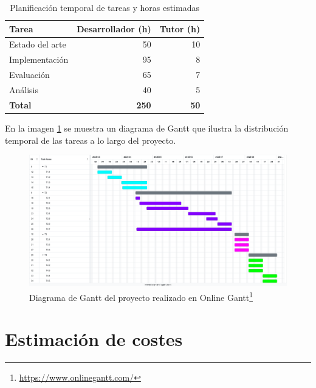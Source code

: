 \begin{table}[!ht]
      \centering
      \setlength{\tabcolsep}{3pt}
      \renewcommand{\arraystretch}{1.1}
      \begin{tabular}{|p{3cm}|r|r|}
            \hline
            \textbf{Tarea}  & \textbf{Desarrollador (h)} & \textbf{Tutor (h)} \\
            \hline
            Estado del arte & 50                         & 10                 \\
            Implementación  & 95                         & 8                  \\
            Evaluación      & 65                         & 7                  \\
            Análisis        & 40                         & 5                  \\
            \hline
            \textbf{Total}  & \textbf{250}               & \textbf{50}        \\
            \hline
      \end{tabular}
      \caption{Planificación temporal de tareas y horas estimadas}
      \label{tab:planificacion-temporal}
\end{table}

En la imagen \ref{fig:diagrama-gantt} se muestra un diagrama de Gantt que ilustra la distribución temporal de las tareas a lo largo del proyecto.

\begin{figure}[!h]
      \centering
      \includegraphics[width=\textwidth]{imagenes/cap2/diagrama_gantt.png}
      \caption{Diagrama de Gantt del proyecto realizado en Online Gantt\footnote{\url{https://www.onlinegantt.com/}}}
      \label{fig:diagrama-gantt}
\end{figure}

\section{Estimación de costes}


